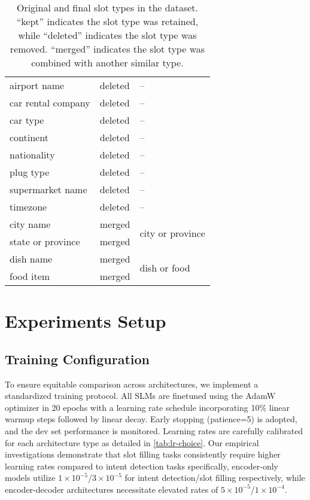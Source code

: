 \begin{table}[h!]
{\begin{tabular}{l|l|l}
airport name & deleted & -- \\
car rental company & deleted & -- \\
car type & deleted & -- \\
continent & deleted & -- \\
nationality & deleted & -- \\
plug type & deleted & -- \\
supermarket name & deleted & -- \\
timezone & deleted & -- \\ \midrule
city name & merged & \multirow{2}{*}{city or province} \\
state or province & merged & \\
dish name & merged & \multirow{2}{*}{dish or food} \\
food item & merged & \\ \bottomrule
\end{tabular}
}
\caption{Original and final slot types in the \dataset{} dataset. ``kept'' indicates the slot type was retained, while ``deleted'' indicates the slot type was removed. ``merged'' indicates the slot type was combined with another similar type.}
\label{tab:slot-types}
\end{table}

\section{Experiments Setup}
\label{sec:exp-more}

\subsection{Training Configuration}
To ensure equitable comparison across architectures, we implement a standardized training protocol. All SLMs are finetuned using the AdamW optimizer in 20 epochs with a learning rate schedule incorporating 10\% linear warmup steps followed by linear decay. Early stopping (patience=5) is adopted, and the dev set performance is monitored. Learning rates are carefully calibrated for each architecture type as detailed in \autoref{tab:lr-choice}. Our empirical investigations demonstrate that slot filling tasks consistently require higher learning rates compared to intent detection tasks specifically, encoder-only models utilize $1\times10^{-5}$/$3\times10^{-5}$ for intent detection/slot filling respectively, while encoder-decoder architectures necessitate elevated rates of $5\times10^{-5}$/$1\times10^{-4}$.

